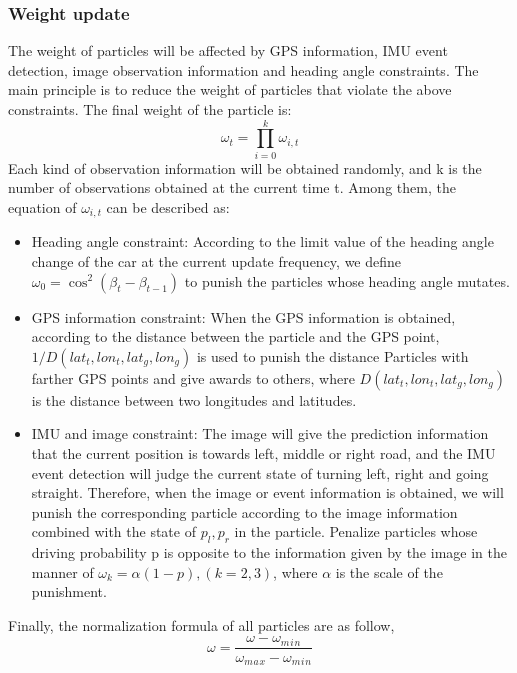 \documentclass[journal]{IEEEtran}
\begin{document}
\subsubsection{Weight update}
The weight of particles will be affected by GPS information, IMU event detection, image observation information and heading angle constraints. The main principle is to reduce the weight of particles that violate the above constraints\cite{gao2017smartphone}. The final weight of the particle is:
\begin{equation}
    \omega _{t} =\prod_{i=0}^{k}\omega_{i,t} 
\end{equation}
Each kind of observation information will be obtained randomly, and k is the number of observations obtained at the current time t. Among them, the equation of $\omega_{i,t}$ can be described as:
\begin{itemize}
    \item Heading angle constraint: According to the limit value of the heading angle change of the car at the current update frequency, we define $\omega _{0} =\cos^{2} (\beta _t-\beta_{t-1})$ to punish the particles whose heading angle mutates.
    \item GPS information constraint: When the GPS information is obtained, according to the distance between the particle and the GPS point, $1/D(lat_t,lon_t,lat_g,lon_g)$ is used to punish the distance Particles with farther GPS points and give awards to others, where  $D(lat_t,lon_t,lat_g,lon_g)$ is the distance between two longitudes and latitudes.
    \item IMU and image constraint: The image will give the prediction information that the current position is towards left, middle or right road, and the IMU event detection will judge the current state of turning left, right and going straight. Therefore, when the image or event information is obtained, we will punish the corresponding particle according to the image information combined with the state of $p_l,p_r$ in the particle. Penalize particles whose driving probability p is opposite to the information given by the image in the manner of $\omega_k=\alpha(1-p),(k=2,3)$, where $\alpha$ is the scale of the punishment.
\end{itemize}

Finally, the normalization formula of all particles are as follow,
\begin{equation}
    \omega=\frac{\omega-\omega_m{}_i{}_n}{\omega_m{}_a{}_x-\omega_m{}_i{}_n}
\end{equation}
\end{document}
